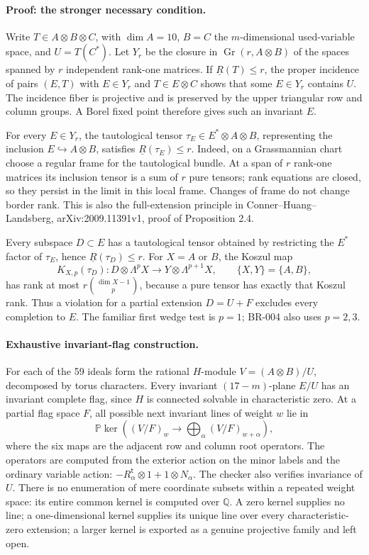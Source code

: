 \paragraph{Proof: the stronger necessary condition.}
Write $T\in A\otimes B\otimes C$, with $\dim A=10$,
$B=C$ the $m$-dimensional used-variable space, and $U=T(C^*)$.
Let $Y_r$ be the closure in $\operatorname{Gr}(r,A\otimes B)$ of
the spaces spanned by $r$ independent rank-one matrices.  If
$\underline R(T)\le r$, the proper incidence of pairs $(E,T)$ with
$E\in Y_r$ and $T\in E\otimes C$ shows that some $E\in Y_r$
contains $U$.  The incidence fiber is projective and is preserved by
the upper triangular row and column groups.  A Borel fixed point therefore
gives such an invariant $E$.

For every $E\in Y_r$, the tautological tensor
$\tau_E\in E^*\otimes A\otimes B$, representing the inclusion
$E\hookrightarrow A\otimes B$, satisfies $\underline R(\tau_E)\le r$.
Indeed, on a Grassmannian chart choose a regular frame for the tautological
bundle.  At a span of $r$ rank-one matrices its inclusion tensor is a sum
of $r$ pure tensors; rank equations are closed, so they persist in the
limit in this local frame.  Changes of frame do not change border rank.
This is also the full-extension principle in Conner--Huang--Landsberg,
arXiv:2009.11391v1, proof of Proposition 2.4.

Every subspace $D\subset E$ has a tautological tensor obtained by
restricting the $E^*$ factor of $\tau_E$, hence
$\underline R(\tau_D)\le r$.  For $X=A$ or $B$, the Koszul map
\[
 K_{X,p}(\tau_D):D\otimes\Lambda^pX
       \longrightarrow Y\otimes\Lambda^{p+1}X,
 \qquad \{X,Y\}=\{A,B\},
\]
has rank at most $r\binom{\dim X-1}{p}$, because a pure tensor
has exactly that Koszul rank.  Thus a violation for a partial extension
$D=U+F$ excludes every completion to $E$.  The familiar first wedge
test is $p=1$; BR-004 also uses $p=2,3$.

\paragraph{Exhaustive invariant-flag construction.}
For each of the 59 ideals form the rational $H$-module
$V=(A\otimes B)/U$, decomposed by torus characters.  Every invariant
$(17-m)$-plane $E/U$ has an invariant complete flag, since $H$ is
connected solvable in characteristic zero.  At a partial flag space $F$,
all possible next invariant lines of weight $w$ lie in
\[
 \mathbb P\ker\left((V/F)_w\longrightarrow
       \bigoplus_{\alpha}(V/F)_{w+\alpha}\right),
\]
where the six maps are the adjacent row and column root operators.
The operators are computed from the exterior action on the minor labels
and the ordinary variable action: $-R_\alpha^{\mathsf t}\otimes1+
1\otimes N_\alpha$.  The checker also verifies invariance of $U$.
There is no enumeration of mere coordinate subsets within a repeated
weight space: its entire common kernel is computed over $\mathbb Q$.
A zero kernel supplies no line; a one-dimensional kernel supplies its
unique line over every characteristic-zero extension; a larger kernel
is exported as a genuine projective family and left open.

